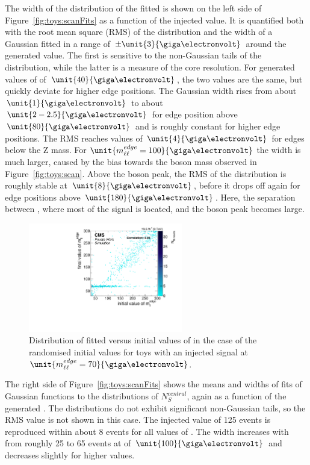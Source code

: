 The width of the distribution of the fitted \mlledge is shown on the left side of Figure~\ref{fig:toys:scanFits} as a function of the injected value. It is quantified both with the root mean square (RMS) of the distribution and the width of a Gaussian fitted in a range of $\pm\unit{3}{\giga\electronvolt}$ around the generated value. The first is sensitive to the non-Gaussian tails of the distribution, while the latter is a measure of the core resolution. For generated values of \mlledge of $\unit{40}{\giga\electronvolt}$, the two values are the same, but quickly deviate for higher edge positions. The Gaussian width rises from about $\unit{1}{\giga\electronvolt}$ to about $\unit{2-2.5}{\giga\electronvolt}$ for edge position above $\unit{80}{\giga\electronvolt}$ and is roughly constant for higher edge positions. The RMS reaches values of $\unit{4}{\giga\electronvolt}$ for edges below the Z mass. For $\unit{\mlledge=100}{\giga\electronvolt}$ the width is much larger, caused by the bias towards the \Z boson mass observed in Figure~\ref{fig:toys:scan}. Above the \Z boson peak, the RMS of the distribution is roughly stable at $\unit{8}{\giga\electronvolt}$, before it drops off again for edge positions above $\unit{180}{\giga\electronvolt}$. Here, the separation between \mlledge, where most of the signal is located, and the \Z boson peak becomes large.


\begin{figure}[hbp]
  \centering

    \includegraphics[width=0.6\textwidth]{plots/results/fit/toyResults/fittedM0vsinitialM0_signalInjectedM70N125_NegSig.pdf}
  \caption{Distribution of fitted versus initial values of \mlledge in the case of the randomised initial values for toys with an injected signal at $\unit{\mlledge = 70}{\giga\electronvolt}$.}
  \label{fig:toys:randM0Signal}
\end{figure}



The right side of Figure~\ref{fig:toys:scanFits} shows the means and widths of fits of Gaussian functions to the distributions of $N_{S}^{central}$, again as a function of the generated \mlledge. The distributions do not exhibit significant non-Gaussian tails, so the RMS value is not shown in this case. The injected value of 125 events is reproduced within about 8 events for all values of \mlledge. The width increases with \mlledge from roughly 25 to 65 events at \mlledge of $\unit{100}{\giga\electronvolt}$ and decreases slightly for higher values.

